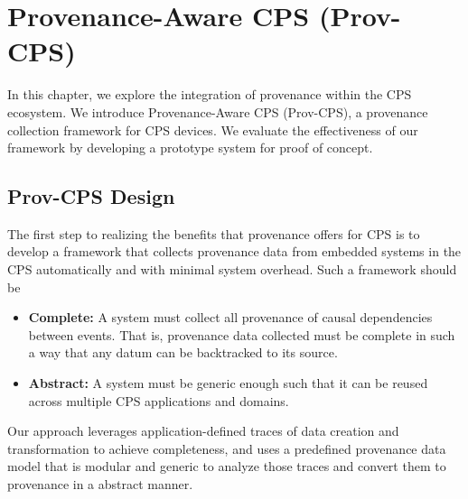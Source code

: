 
\chapter{Provenance-Aware CPS (Prov-CPS)}

In this chapter, we explore the integration of provenance within the CPS ecosystem. We introduce Provenance-Aware CPS (Prov-CPS), a  provenance collection framework for CPS devices. We evaluate the effectiveness of our framework by developing a prototype system for proof of concept.

\section{Prov-CPS Design}\label{sec:design}

The first step to realizing the benefits that provenance offers for CPS is to develop a framework that collects provenance data from embedded systems in the CPS automatically and with minimal system overhead. Such a framework should be

\begin{itemize}

\item \textbf{Complete:} A system must collect all provenance of causal dependencies between events. That is, provenance data collected must be complete in such a way that any datum can be backtracked to its source. %

\item \textbf{Abstract:} A system must be generic enough such that it can be reused across multiple CPS applications and domains. 

\end{itemize}

Our approach leverages application-defined traces of data creation and transformation to achieve completeness, and uses a predefined provenance data model that is modular and generic to analyze those traces and convert them to provenance in a abstract manner.


